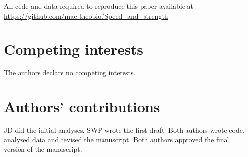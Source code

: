 \documentclass[12pt]{article}
\begin{document}
All code and data required to reproduce this paper available at \url{https://github.com/mac-theobio/Speed_and_strength}

\section*{Competing interests}

The authors declare no competing interests.

\section*{Authors’ contributions}

JD did the initial analyses. SWP wrote the first draft. Both authors wrote code, analyzed data and revised the manuscript. Both authors approved the final version of the manuscript.
\end{document}
